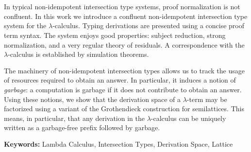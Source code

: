 \section*{}
In typical non-idempotent intersection type systems, proof normalization is not confluent.
In this work we introduce a confluent non-idempotent intersection type system for the $\lambda$-calculus.
Typing derivations are presented using a concise proof term syntax.
The system enjoys good properties: subject reduction, strong normalization,
and a very regular theory of residuals.
A correspondence with the $\lambda$-calculus is established by simulation theorems.

The machinery of non-idempotent intersection types allows us to track the usage of
resources required to obtain an answer.
In particular, it induces a notion of \textit{garbage}: a computation is garbage
if it does not contribute to obtain an answer.
Using these notions,
we show that the derivation space of a $\lambda$-term may be factorized using a
variant of the Grothendieck construction for semilattices.
This means, in particular, that any derivation in the $\lambda$-calculus can be
uniquely written as a garbage-free prefix followed by garbage.


\vspace{2cm}
\noindent
\textbf{Keywords:} Lambda Calculus, Intersection Types, Derivation Space, Lattice
